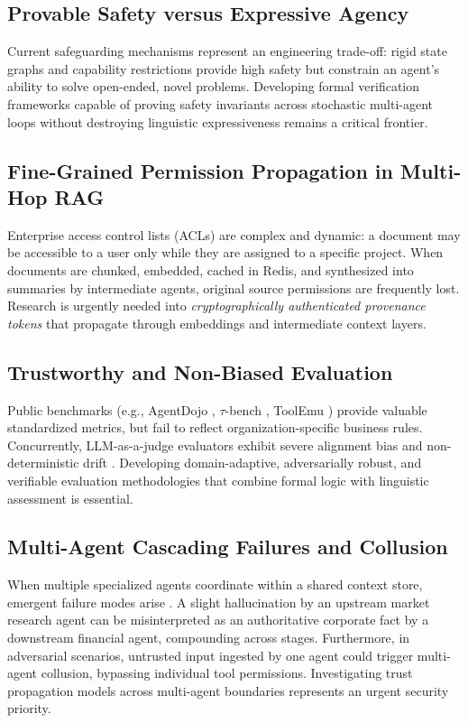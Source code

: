 \documentclass[10pt,a4paper,twocolumn]{article}
\begin{document}
\subsection{Provable Safety versus Expressive Agency}
Current safeguarding mechanisms represent an engineering trade-off: rigid state graphs and capability restrictions provide high safety but constrain an agent's ability to solve open-ended, novel problems. Developing formal verification frameworks capable of proving safety invariants across stochastic multi-agent loops without destroying linguistic expressiveness remains a critical frontier.

\subsection{Fine-Grained Permission Propagation in Multi-Hop RAG}
Enterprise access control lists (ACLs) are complex and dynamic: a document may be accessible to a user only while they are assigned to a specific project. When documents are chunked, embedded, cached in Redis, and synthesized into summaries by intermediate agents, original source permissions are frequently lost. Research is urgently needed into \emph{cryptographically authenticated provenance tokens} that propagate through embeddings and intermediate context layers.

\subsection{Trustworthy and Non-Biased Evaluation}
Public benchmarks (e.g., AgentDojo \cite{debenedetti2024agentdojo}, $\tau$-bench \cite{yao2024taubench}, ToolEmu \cite{ruan2024toolemu}) provide valuable standardized metrics, but fail to reflect organization-specific business rules. Concurrently, LLM-as-a-judge evaluators exhibit severe alignment bias and non-deterministic drift \cite{zheng2023judge}. Developing domain-adaptive, adversarially robust, and verifiable evaluation methodologies that combine formal logic with linguistic assessment is essential.

\subsection{Multi-Agent Cascading Failures and Collusion}
When multiple specialized agents coordinate within a shared context store, emergent failure modes arise \cite{cemri2025multiagent}. A slight hallucination by an upstream market research agent can be misinterpreted as an authoritative corporate fact by a downstream financial agent, compounding across stages. Furthermore, in adversarial scenarios, untrusted input ingested by one agent could trigger multi-agent collusion, bypassing individual tool permissions. Investigating trust propagation models across multi-agent boundaries represents an urgent security priority.
\end{document}
